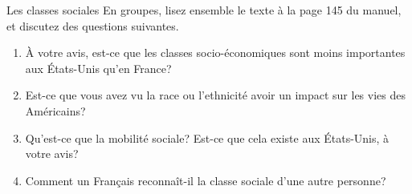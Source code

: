 \begin{frame}{Les classes sociales}
  En groupes, lisez ensemble le texte à la page 145 du manuel, et discutez des questions suivantes.
  \begin{enumerate}
    \item À votre avis, est-ce que les classes socio-économiques sont moins importantes aux États-Unis qu'en France?
    \item Est-ce que vous avez vu la race ou l'ethnicité avoir un impact sur les vies des Américains?
    \item Qu'est-ce que la mobilité sociale? Est-ce que cela existe aux États-Unis, à votre avis?
    \item Comment un Français reconnaît-il la classe sociale d'une autre personne?
  \end{enumerate}
\end{frame}